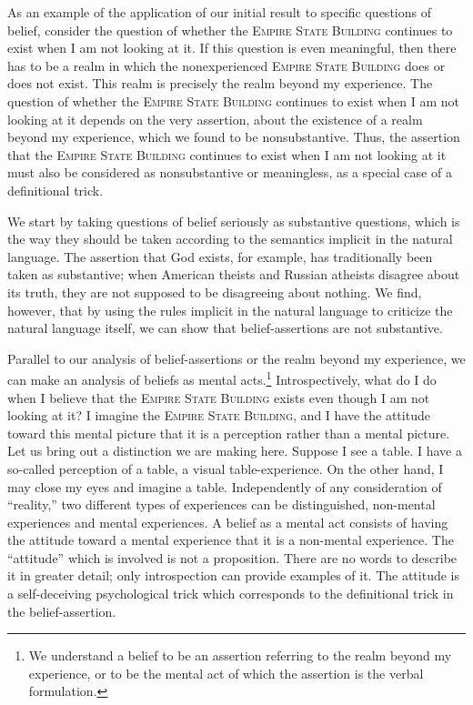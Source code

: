As an example of the application of our initial result to specific questions of belief, consider the question of whether the \textsc{Empire State Building} continues to exist when I am not looking at it. If this question is even meaningful, then there has to be a realm in which the nonexperienced \textsc{Empire State Building} does or does not exist. This realm is precisely the realm beyond my experience. The question of whether the \textsc{Empire State Building} continues to exist when I am not looking at it depends on the very assertion, about the existence of a realm beyond my experience, which we found to be nonsubstantive. Thus, the assertion that the \textsc{Empire State Building} continues to exist when I am not looking at it must also be considered as nonsubstantive or meaningless, as a special case of a definitional trick. 

We start by taking questions of belief seriously as substantive questions, which is the way they should be taken according to the semantics implicit in the natural language. The assertion that God exists, for example, has traditionally been taken as substantive; when American theists and Russian atheists disagree about its truth, they are not supposed to be disagreeing about nothing. We find, however, that by using the rules implicit in the natural language to criticize the natural language itself, we can show that belief-assertions are not substantive. 

Parallel to our analysis of belief-assertions or the realm beyond my experience, we can make an analysis of beliefs as mental acts.\footnote{We understand a belief to be an assertion referring to the realm beyond my experience, or to be the mental act of which the assertion is the verbal formulation.} Introspectively, what do I do when I believe that the \textsc{Empire State Building} exists even though I am not looking at it? I imagine the \textsc{Empire State Building}, and I have the attitude toward this mental picture that it is a perception rather than a mental picture. Let us bring out a distinction we are making here. Suppose I see a table. I have a so-called perception of a table, a visual table-experience. On the other hand, I may close my eyes and imagine a table. Independently of any consideration of \enquote{reality,} two different types of experiences can be distinguished, non-mental experiences and mental experiences. A belief as a mental act consists of having the attitude toward a mental experience that it is a non-mental experience. The \enquote{attitude} which is involved is not a proposition. There are no words to describe it in greater detail; only introspection can provide examples of it. The attitude is a self-deceiving psychological trick which corresponds to the definitional trick in the belief-assertion. 

